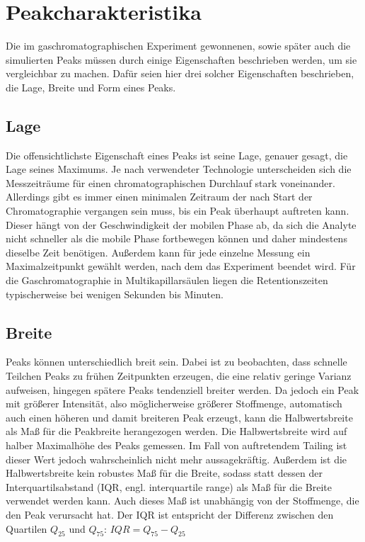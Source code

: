 \section{Peakcharakteristika}
Die im gaschromatographischen Experiment gewonnenen, sowie später auch die simulierten Peaks müssen durch einige Eigenschaften beschrieben werden, um sie vergleichbar zu machen. Dafür seien hier drei solcher Eigenschaften beschrieben, die Lage, Breite und Form eines Peaks.


\subsection{Lage}
Die offensichtlichste Eigenschaft eines Peaks ist seine Lage, genauer gesagt, die Lage seines Maximums. Je nach verwendeter Technologie unterscheiden sich die Messzeiträume für einen chromatographischen Durchlauf stark voneinander. %
Allerdings gibt es immer einen minimalen Zeitraum der nach Start der Chromatographie vergangen sein muss, bis ein Peak überhaupt auftreten kann. Dieser hängt von der Geschwindigkeit der mobilen Phase ab, da sich die Analyte nicht schneller als die mobile Phase fortbewegen können und daher mindestens dieselbe Zeit benötigen. Außerdem kann für jede einzelne Messung ein Maximalzeitpunkt gewählt werden, nach dem das Experiment beendet wird.
Für die Gaschromatographie in Multikapillarsäulen liegen die Retentionszeiten typischerweise bei wenigen Sekunden bis Minuten.


\subsection{Breite}
Peaks können unterschiedlich breit sein. Dabei ist zu beobachten, dass schnelle Teilchen Peaks zu frühen Zeitpunkten erzeugen, die eine relativ geringe Varianz aufweisen, hingegen spätere Peaks tendenziell breiter werden.
Da jedoch ein Peak mit größerer Intensität, also möglicherweise größerer Stoffmenge, automatisch auch einen höheren und damit breiteren Peak erzeugt, kann die Halbwertsbreite als Maß für die Peakbreite herangezogen werden. Die Halbwertsbreite wird auf halber Maximalhöhe des Peaks gemessen. Im Fall von auftretendem Tailing ist dieser Wert jedoch wahrscheinlich nicht mehr aussagekräftig. Außerdem ist die Halbwertsbreite kein robustes Maß für die Breite, sodass statt dessen der Interquartilsabstand (IQR, engl. interquartile range) als Maß für die Breite verwendet werden kann. Auch dieses Maß ist unabhängig von der Stoffmenge, die den Peak verursacht hat. Der IQR ist entspricht der Differenz zwischen den Quartilen $Q_{25}$ und $Q_{75}$: $IQR = Q_{75} -Q_{25}$ 

